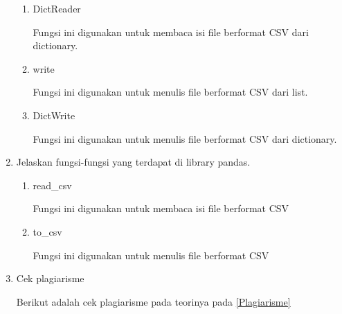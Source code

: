 \begin{enumerate}
\begin{enumerate}
		
		
		\item DictReader
		
		Fungsi ini digunakan untuk membaca isi file berformat CSV dari dictionary.
		
		
		
		\item write
		
		Fungsi ini digunakan untuk menulis file berformat CSV dari list.
		
		
		
		\item DictWrite
		
		Fungsi ini digunakan untuk menulis file berformat CSV dari dictionary.
		
		
		
	\end{enumerate}

   \item Jelaskan fungsi-fungsi yang terdapat di library pandas.

       \begin{enumerate}
		\item read\_csv
		
		Fungsi ini digunakan untuk membaca isi file berformat CSV
		
		
		
		\item to\_csv
		
		Fungsi ini digunakan untuk menulis file berformat CSV
		
		
		
	\end{enumerate}
   \item Cek plagiarisme

Berikut adalah cek plagiarisme pada teorinya pada \ref{Plagiarisme}


\end{enumerate}
